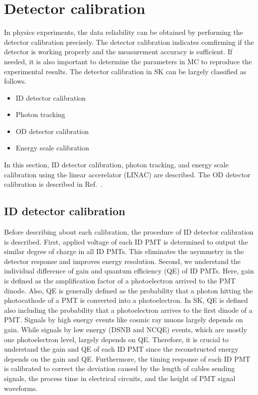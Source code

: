

\section{Detector calibration}\label{Section_Calibration}
\vs\hs
In physics experiments, the data reliability can be obtained by performing the detector calibration precisely.
The detector calibration indicates comfirming if the detector is working properly and the measurement accuracy is sufficient.
If needed, it is also important to determine the parameters in MC to reproduce the experimental results.
The detector calibration in SK can be largely classified as follows.
\begin{itemize}
	\item ID detector calibration
	\item Photon tracking
	\item OD detector calibration
	\item Energy scale calibration
\end{itemize}
In this section, ID detector calibration, photon tracking, and energy scale calibration using the linear accerelator (LINAC) are described.
The OD detector calibration is described in Ref.~\cite{2014AbeCalib}.





\subsection{ID detector calibration}
\vs\hs
Before describing about each calibration, the procedure of ID detector calibration is described.
First, applied voltage of each ID PMT is determined to output the similar degree of charge in all ID PMTs.
This eliminates the asymmetry in the detector response and improves energy resolution.
Second, we understand the individual difference of gain and quantum efficiency (QE) of ID PMTs.
Here, gain is defined as the amplification factor of a photoelectron arrived to the PMT dinode.
Also, QE is generally defined as the probability that a photon hitting the photocathode of a PMT is converted into a photoelectron.
In SK, QE is defined also including the probability that a photoelectron arrives to the first dinode of a PMT.
Signals by high energy events like cosmic ray muons largely depends on gain.
While signals by low energy (DSNB and NCQE) events, which are mostly one photoelectron level, largely depends on QE.
Therefore, it is crucial to understand the gain and QE of each ID PMT since the reconstructed energy depends on the gain and QE.
Furthermore, the timing response of each ID PMT is calibrated to correct the deviation caused by the length of cables sending signals, the process time in electrical circuits, and the height of PMT signal waveforms.


